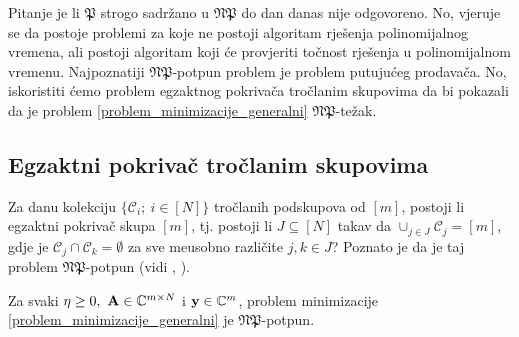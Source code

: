 \documentclass[a4paper,twoside,12pt]{memoir} %
\newcommand{\vect}[1]{\mathbf{#1}}
\renewcommand{\vec}{\vect}
\begin{document}
Pitanje je li $\mathfrak{P}$ strogo sadr\v{z}ano u  $\mathfrak{NP}$ do dan danas nije odgovoreno. No, vjeruje se da postoje problemi za koje ne postoji algoritam rje\v{s}enja polinomijalnog vremena, ali postoji algoritam koji \'ce provjeriti to\v{c}nost rje\v{s}enja u polinomijalnom vremenu.
Najpoznatiji $\mathfrak{NP}$-potpun problem je problem putuju\'ceg prodava\v{c}a. No, iskoristiti \'cemo  problem egzaktnog pokriva\v{c}a tro\v{c}lanim skupovima da bi pokazali da je problem \eqref{problem_minimizacije_generalni} $\mathfrak{NP}$-te\v{z}ak.

\subsection[Egzaktni pokriva\v{c} tro\v{c}lanim skupovima][Egzaktni pokriva\v{c} tro\v{c}lanim skupovima]{Egzaktni pokriva\v{c} tro\v{c}lanim skupovima}
Za danu kolekciju $\{\mathcal{C}_i;\ i \in [N]\}$ tro\v{c}lanih podskupova od $[m]$, postoji li egzaktni pokriva\v{c} skupa $[m]$, tj. postoji li $J \subseteq [N]$ takav da $\cup_{j \in J}\mathcal{C}_j=[m]$, gdje je $\mathcal{C}_j \cap \mathcal{C}_k = \emptyset$ za sve me\dj usobno razli\v{c}ite $j,k \in J$? Poznato je da je taj problem $\mathfrak{NP}$-potpun (vidi \cite{Karp72}, \cite{garey1979computers}).
\begin{thm}
    Za svaki $\eta \geq 0,\ \vec A \in \C^{m \times N}$ i $\vec y \in \C^m$, problem minimizacije \eqref{problem_minimizacije_generalni} je $\mathfrak{NP}$-potpun.
\end{thm}
\end{document}
